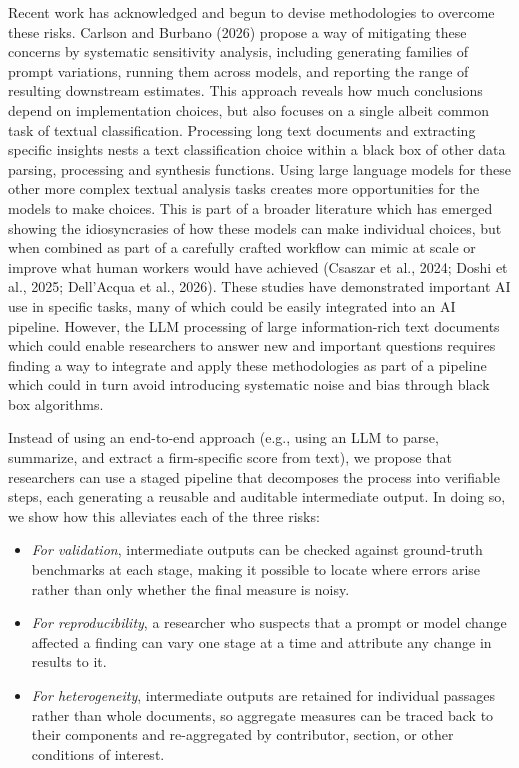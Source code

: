 \documentclass[11pt]{article}
\begin{document}
Recent work has acknowledged and begun to devise methodologies to overcome these risks. Carlson and Burbano (2026) propose a way of mitigating these concerns by systematic sensitivity analysis, including generating families of prompt variations, running them across models, and reporting the range of resulting downstream estimates. This approach reveals how much conclusions depend on implementation choices, but also focuses on a single albeit common task of textual classification. Processing long text documents and extracting specific insights nests a text classification choice within a black box of other data parsing, processing and synthesis functions. Using large language models for these other more complex textual analysis tasks creates more opportunities for the models to make choices. This is part of a broader literature which has emerged showing the idiosyncrasies of how these models can make individual choices, but when combined as part of a carefully crafted workflow can mimic at scale or improve what human workers would have achieved (Csaszar et al., 2024; Doshi et al., 2025; Dell'Acqua et al., 2026). These studies have demonstrated important AI use in specific tasks, many of which could be easily integrated into an AI pipeline. However, the LLM processing of large information-rich text documents which could enable researchers to answer new and important questions requires finding a way to integrate and apply these methodologies as part of a pipeline which could in turn avoid introducing systematic noise and bias through black box algorithms.

Instead of using an end-to-end approach (e.g., using an LLM to parse, summarize, and extract a firm-specific score from text), we propose that researchers can use a staged pipeline that decomposes the process into verifiable steps, each generating a reusable and auditable intermediate output. In doing so, we show how this alleviates each of the three risks:
\begin{itemize}
    \item \textit{For validation}, intermediate outputs can be checked against ground-truth benchmarks at each stage, making it possible to locate where errors arise rather than only whether the final measure is noisy.
    \item \textit{For reproducibility}, a researcher who suspects that a prompt or model change affected a finding can vary one stage at a time and attribute any change in results to it.
    \item \textit{For heterogeneity}, intermediate outputs are retained for individual passages rather than whole documents, so aggregate measures can be traced back to their components and re-aggregated by contributor, section, or other conditions of interest.
\end{itemize}
\end{document}
